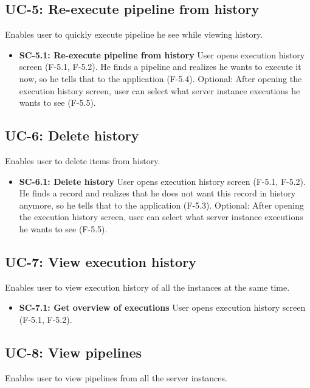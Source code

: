\subsection*{UC-5: Re-execute pipeline from history}
Enables user to quickly execute pipeline he see while viewing history.

\begin{itemize}
\item \textbf{SC-5.1: Re-execute pipeline from history}
User opens execution history screen (F-5.1, F-5.2). He finds a pipeline and realizes he wants to execute it now, so he tells that to the application (F-5.4). Optional: After opening the execution history screen, user can select what server instance executions he wants to see (F-5.5).

\end{itemize}

\subsection*{UC-6: Delete history}
Enables user to delete items from history.

\begin{itemize}
\item \textbf{SC-6.1: Delete history}
User opens execution history screen (F-5.1, F-5.2). He finds a record and realizes that he does not want this record in history anymore, so he tells that to the application (F-5.3). Optional: After opening the execution history screen, user can select what server instance executions he wants to see (F-5.5).

\end{itemize}

\subsection*{UC-7: View execution history}
Enables user to view execution history of all the instances at the same time.

\begin{itemize}
\item \textbf{SC-7.1: Get overview of executions}
User opens execution history screen (F-5.1, F-5.2).

\end{itemize}

\subsection*{UC-8: View pipelines}
Enables user to view pipelines from all the server instances.

